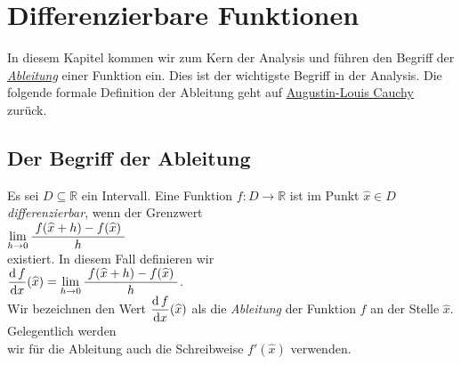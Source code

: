 \chapter{Differenzierbare Funktionen}
In diesem Kapitel kommen wir zum Kern der Analysis und f\"uhren den Begriff der 
\href{http://de.wikipedia.org/wiki/Differentialrechnung}{\emph{Ableitung}} einer Funktion ein. 
Dies ist der wichtigste Begriff in der Analysis.  Die folgende formale Definition der Ableitung geht auf 
\href{http://de.wikipedia.org/wiki/Augustin-Louis_Cauchy}{Augustin-Louis Cauchy} zur\"uck.


\section{Der Begriff der Ableitung}
\begin{Definition}[Ableitung]
Es sei $D \subseteq \mathbb{R}$ ein Intervall.  
Eine Funktion $f: D \rightarrow \mathbb{R}$ ist im Punkt $\widehat{x} \in D$ \emph{differenzierbar},
wenn der Grenzwert
\\[0.3cm]
\hspace*{1.3cm}
$\lim\limits_{h \rightarrow 0} \displaystyle\frac{\;\displaystyle f(\widehat{x} + h) - f(\widehat{x})\;}{\;\displaystyle h\;}$
\\[0.3cm]
existiert.  In diesem Fall definieren wir 
\\[0.3cm]
\hspace*{1.3cm}
$\displaystyle\frac{\mathrm{d}\,f}{\mathrm{d}x}(\widehat{x}) = \lim\limits_{h \rightarrow 0}
\displaystyle\frac{\;\displaystyle f(\widehat{x} + h) - f(\widehat{x})\;}{\;\displaystyle h\;}$.
\\[0.3cm]
Wir bezeichnen den Wert $\displaystyle\frac{\mathrm{d}\,f}{\mathrm{d}x}(\widehat{x})$ als die \emph{Ableitung} der
Funktion $f$ an der Stelle $\widehat{x}$.  Gelegentlich werden \\[0.2cm]
wir f\"ur die Ableitung auch die Schreibweise 
$f'(\widehat{x})$ verwenden.
\eod
\end{Definition}



